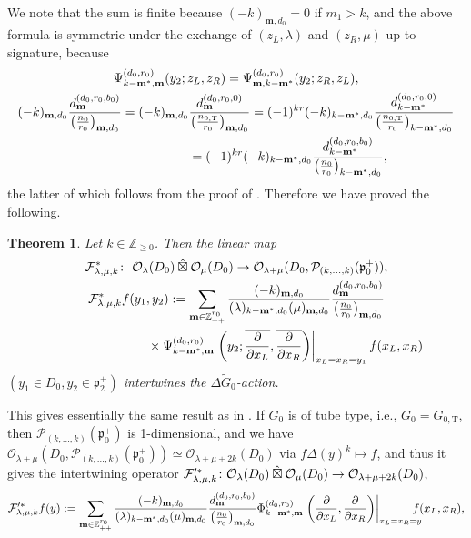 \documentclass[pdftex]{sigma}
\numberwithin{equation}{section}
\newtheorem{Theorem}{Theorem}[section]
\newcommand{\bm}{\mathbf{m}}
\newcommand{\BZ}{\mathbb{Z}}
\newcommand{\fp}{\mathfrak{p}}
\newcommand{\cF}{\mathcal{F}}
\newcommand{\cO}{\mathcal{O}}
\newcommand{\cP}{\mathcal{P}}
\newcommand{\rT}{\mathrm{T}}
\newcommand{\hboxtimes}{\mathbin{\hat{\boxtimes}}}
\begin{document}
We note that the sum is finite because $(-k)_{\bm,d_0}=0$ if $m_1>k$,
and the above formula is symmetric under the exchange of $(z_L,\lambda)$ and $(z_R,\mu)$ up to signature, because
\begin{gather*}
\Psi_{k-\bm^*,\bm}^{(d_0,r_0)}(y_2;z_L,z_R)=\Psi_{\bm,k-\bm^*}^{(d_0,r_0)}(y_2;z_R,z_L),\\
(-k)_{\bm,d_0}\frac{d_\bm^{(d_0,r_0,b_0)}}{\big(\frac{n_0}{r_0}\big)_{\bm,d_0}}
=(-k)_{\bm,d_0}\frac{d_\bm^{(d_0,r_0,0)}}{\big(\frac{n_{0,\rT}}{r_0}\big)_{\bm,d_0}}
=(-1)^{kr}(-k)_{k-\bm^*,d_0}\frac{d_{k-\bm^*}^{(d_0,r_0,0)}}{\big(\frac{n_{0,\rT}}{r_0}\big)_{k-\bm^*,d_0}}\\
\hphantom{(-k)_{\bm,d_0}\frac{d_\bm^{(d_0,r_0,b_0)}}{\big(\frac{n_0}{r_0}\big)_{\bm,d_0}}}{}
=(-1)^{kr}(-k)_{k-\bm^*,d_0}\frac{d_{k-\bm^*}^{(d_0,r_0,b_0)}}{\big(\frac{n_0}{r_0}\big)_{k-\bm^*,d_0}},
\end{gather*}
the latter of which follows from the proof of \cite[Proposition 2.6]{N}.
Therefore we have proved the following.
\begin{Theorem}\label{thm_tensor}
Let $k\in\BZ_{\ge 0}$. Then the linear map
\begin{gather*}
\cF_{\lambda,\mu,k}^*\colon \ \cO_\lambda(D_0)\hboxtimes\cO_\mu(D_0)\to \cO_{\lambda+\mu}(D_0,\cP_{(k,\ldots,k)}(\fp^+_0)), \\
\cF_{\lambda,\mu,k}^*f(y_1,y_2) :=\sum_{\bm\in\BZ_{++}^{r_0}}\frac{(-k)_{\bm,d_0}}{(\lambda)_{k-\bm^*,d_0}(\mu)_{\bm,d_0}}
\frac{d_\bm^{(d_0,r_0,b_0)}}{\big(\frac{n_0}{r_0}\big)_{\bm,d_0}}\\
\hphantom{\cF_{\lambda,\mu,k}^*f(y_1,y_2) :=}{} \times\Psi_{k-\bm^*,\bm}^{(d_0,r_0)}
\left.\left(y_2;\overline{\frac{\partial}{\partial x_L}},\overline{\frac{\partial}{\partial x_R}}\right)
\right|_{x_L=x_R=y_1}f(x_L,x_R)
\end{gather*}
$(y_1\in D_0, y_2\in\fp^+_2)$ intertwines the $\Delta \tilde{G}_0$-action.
\end{Theorem}
This gives essentially the same result as in \cite{PZ}.
If $G_0$ is of tube type, i.e., $G_0=G_{0,\rT}$, then $\cP_{(k,\ldots,k)}(\fp^+_0)$ is 1-dimensional, and we have
$\cO_{\lambda+\mu}(D_0,\cP_{(k,\ldots,k)}(\fp^+_0))\simeq \cO_{\lambda+\mu+2k}(D_0)$ via $f\Delta(y)^k\mapsto f$,
and thus it gives the intertwining operator $\cF_{\lambda,\mu,k}^{\prime*}\colon \cO_\lambda(D_0)\hboxtimes\cO_\mu(D_0)\to\linebreak
\cO_{\lambda+\mu+2k}(D_0)$,
\begin{gather*} \cF_{\lambda,\mu,k}^{\prime *}f(y)
:=\sum_{\bm\in\BZ_{++}^{r_0}}\frac{(-k)_{\bm,d_0}}{(\lambda)_{k-\bm^*,d_0}(\mu)_{\bm,d_0}}
\frac{d_\bm^{(d_0,r_0,b_0)}}{\big(\frac{n_0}{r_0}\big)_{\bm,d_0}}
\Phi_{k-\bm^*,\bm}^{(d_0,r_0)}
\left.\left(\frac{\partial}{\partial x_L},\frac{\partial}{\partial x_R}\right)
\right|_{x_L=x_R=y}\hspace{-10pt}f(x_L,x_R), \end{gather*}
\end{document}
